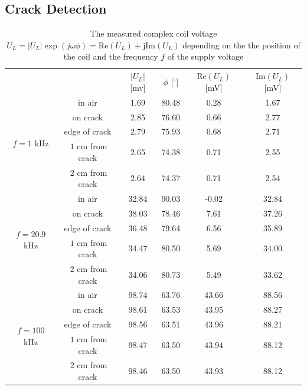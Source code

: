 \subsection{Crack Detection}
\begin{table}[htbp]
	\centering
		\begin{tabular}{cc|c|c|c|c}															
														   &   & $|U_L|$ [mv] 		& $\phi$ [$^{\circ}$] 			& $\text{Re}(U_L)$ [mV] & $\text{Im}(U_L)$ [mV] \\
			\cline{1-6}
			\multirow{5}{*}{$f=1$ kHz} 		& in air   						& 1.69  			& 80.48 			& 0.28  							& 1.67 \\
																	& on crack 						& 2.85  			& 76.60 			& 0.66  							& 2.77 \\
																	& edge of crack 			& 2.79  			& 75.93 			& 0.68  							& 2.71 \\
																	& $~1$ cm from crack 	& 2.65  			& 74.38 			& 0.71  							& 2.55 \\
																	& $~2$ cm from crack 	& 2.64  			& 74.37 			& 0.71  							& 2.54 \\
			\cline{1-6}
			\multirow{5}{*}{$f=20.9$ kHz} & in air   						& 32.84 			& 90.03 			& -0.02 							& 32.84 \\
																	& on crack 						& 38.03 			& 78.46 			& 7.61  							& 37.26 \\
																	& edge of crack 			& 36.48 			& 79.64 			& 6.56  							& 35.89 \\
																	& $~1$ cm from crack 	& 34.47 			& 80.50			 	& 5.69  							& 34.00 \\
																	& $~2$ cm from crack 	& 34.06 			& 80.73 			& 5.49  							& 33.62 \\
		  \cline{1-6}
			\multirow{5}{*}{$f=100$ kHz} 	& in air   						& 98.74 			& 63.76 			& 43.66 							& 88.56 \\
																	& on crack 						& 98.61 			& 63.53 			& 43.95 							& 88.27 \\
																	& edge of crack	 			& 98.56 			& 63.51 			& 43.96 							& 88.21 \\
																	& $~1$ cm from crack 	& 98.47 			& 63.50 			& 43.94 							& 88.12 \\
																	& $~2$ cm from crack 	& 98.46 			& 63.50 			& 43.93 							& 88.12 \\
		\end{tabular}
	\caption{The measured complex coil voltage $U_L=|U_L|\exp(j\omega\phi)=\text{Re}(U_L)+\text{jIm}(U_L)$ depending on the the position of the coil and the frequency $f$ of the supply voltage}
	\label{tab:crack}
\end{table}
